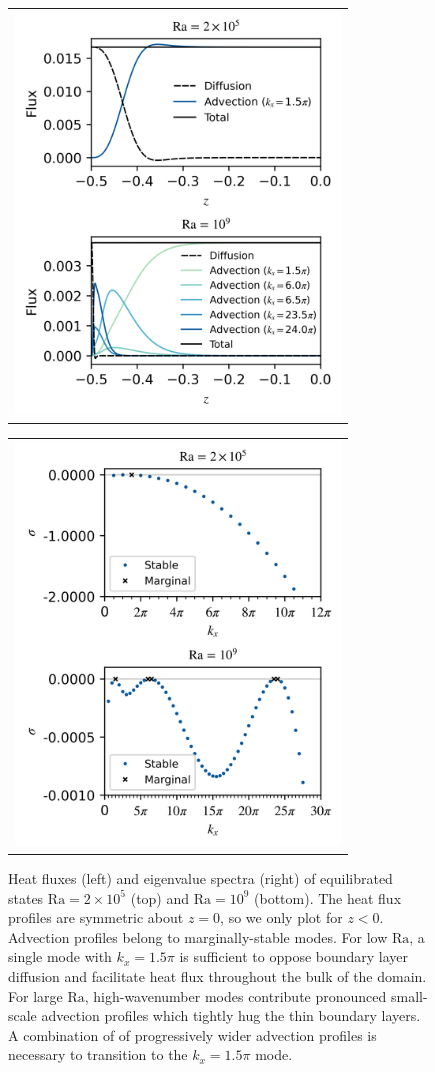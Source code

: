 \documentclass[reprint,amsmath,amssymb,aps]{revtex4-1}
\newcommand\Ra{\mathrm{Ra}}
\begin{document}
\begin{figure}
    \centering
    \begin{tabular}{@{}c@{}}
        \includegraphics[width=3.4in]{flux_sup_n.png}
    \end{tabular}
    \begin{tabular}{@{}c@{}}
        \includegraphics[width=3.4in]{EV_spectra_2ra.png}
    \end{tabular}
    \caption{Heat fluxes (left) and eigenvalue spectra (right) of equilibrated states $\Ra = 2 \times 10^5$ (top) and $\Ra = 10^9$ (bottom). 
    The heat flux profiles are symmetric about $z=0$, so we only plot for $z<0$.
    Advection profiles belong to marginally-stable modes. 
    For low $\Ra$, a single mode with $k_x = 1.5\pi$ is sufficient to oppose boundary layer diffusion and facilitate heat flux throughout the bulk of the domain. 
    For large $\Ra$, high-wavenumber modes contribute pronounced small-scale advection profiles which tightly hug the thin boundary layers. 
    A combination of of progressively wider advection profiles is necessary to transition to the $k_x = 1.5\pi$ mode.}
    \label{fig:flux}
\end{figure}
\end{document}
